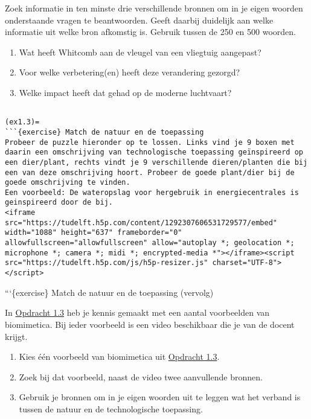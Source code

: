 Zoek informatie in ten minste drie verschillende bronnen om in je eigen
woorden onderstaande vragen te beantwoorden. Geeft daarbij duidelijk aan
welke informatie uit welke bron afkomstig is. Gebruik tussen de 250 en
500 woorden.

\begin{enumerate}
\def\labelenumi{\arabic{enumi}.}
\tightlist
\item
  Wat heeft Whitcomb aan de vleugel van een vliegtuig aangepast?
\item
  Voor welke verbetering(en) heeft deze verandering gezorgd?
\item
  Welke impact heeft dat gehad op de moderne luchtvaart?
\end{enumerate}

\begin{verbatim}

(ex1.3)=
```{exercise} Match de natuur en de toepassing
Probeer de puzzle hieronder op te lossen. Links vind je 9 boxen met daarin een omschrijving van technologische toepassing geïnspireerd op een dier/plant, rechts vindt je 9 verschillende dieren/planten die bij een van deze omschrijving hoort. Probeer de goede plant/dier bij de goede omschrijving te vinden. 
Een voorbeeld: De wateropslag voor hergebruik in energiecentrales is geinspireerd door de bij.
<iframe src="https://tudelft.h5p.com/content/1292307606531729577/embed" width="1088" height="637" frameborder="0" allowfullscreen="allowfullscreen" allow="autoplay *; geolocation *; microphone *; camera *; midi *; encrypted-media *"></iframe><script src="https://tudelft.h5p.com/js/h5p-resizer.js" charset="UTF-8"></script>
\end{verbatim}

```\{exercise\} Match de natuur en de toepassing (vervolg)

In \href{ex1.3}{Opdracht 1.3} heb je kennis gemaakt met een aantal
voorbeelden van biomimetica. Bij ieder voorbeeld is een video
beschikbaar die je van de docent krijgt.

\begin{enumerate}
\def\labelenumi{\alph{enumi})}
\item
  Kies één voorbeeld van biomimetica uit \href{ex1.3}{Opdracht 1.3}.
\item
  Zoek bij dat voorbeeld, naast de video twee aanvullende bronnen.
\item
  Gebruik je bronnen om in je eigen woorden uit te leggen wat het
  verband is tussen de natuur en de technologische toepassing.
\end{enumerate}

